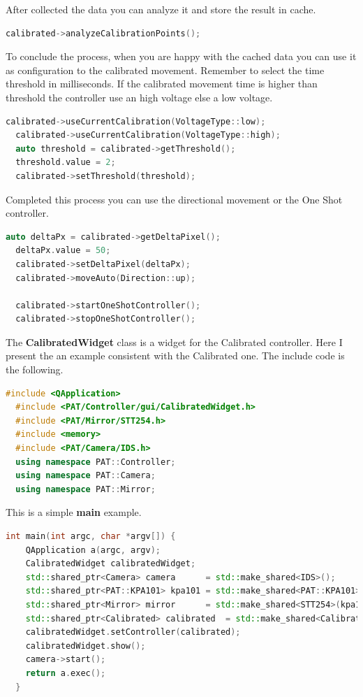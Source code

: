 After collected the data you can analyze it and store the result in
cache.

\begin{lstlisting}[language=c++, gobble=2]
  calibrated->analyzeCalibrationPoints();
\end{lstlisting}

To conclude the process, when you are happy with the cached data you can
use it as configuration to the calibrated movement. Remember to select
the time threshold in milliseconds. If the calibrated movement time is
higher than threshold the controller use an high voltage else a low
voltage.

\begin{lstlisting}[language=c++, gobble=2]
  calibrated->useCurrentCalibration(VoltageType::low);
  calibrated->useCurrentCalibration(VoltageType::high);
  auto threshold = calibrated->getThreshold();
  threshold.value = 2;
  calibrated->setThreshold(threshold);
\end{lstlisting}

Completed this process you can use the directional movement or the One
Shot controller.

\begin{lstlisting}[language=c++, gobble=2]
  auto deltaPx = calibrated->getDeltaPixel();
  deltaPx.value = 50;
  calibrated->setDeltaPixel(deltaPx);
  calibrated->moveAuto(Direction::up);
  
  calibrated->startOneShotController();
  calibrated->stopOneShotController();
\end{lstlisting}


The \textbf{CalibratedWidget} class is a widget for the Calibrated
controller. Here I present the an example consistent with the Calibrated
one. The include code is the following.

\begin{lstlisting}[language=c++, gobble=2]
  #include <QApplication>
  #include <PAT/Controller/gui/CalibratedWidget.h>
  #include <PAT/Mirror/STT254.h>
  #include <memory>
  #include <PAT/Camera/IDS.h>
  using namespace PAT::Controller;
  using namespace PAT::Camera;
  using namespace PAT::Mirror;
\end{lstlisting}

This is a simple \textbf{main} example.

\begin{lstlisting}[language=c++, gobble=2]
  int main(int argc, char *argv[]) {
    QApplication a(argc, argv);
    CalibratedWidget calibratedWidget;
    std::shared_ptr<Camera> camera      = std::make_shared<IDS>();
    std::shared_ptr<PAT::KPA101> kpa101 = std::make_shared<PAT::KPA101>();
    std::shared_ptr<Mirror> mirror      = std::make_shared<STT254>(kpa101);
    std::shared_ptr<Calibrated> calibrated  = std::make_shared<Calibrated>(mirror, camera->getFrame()->getCentroid(), camera->getFrame()->getTarget());
    calibratedWidget.setController(calibrated);
    calibratedWidget.show();
    camera->start();
    return a.exec();
  }
\end{lstlisting}

